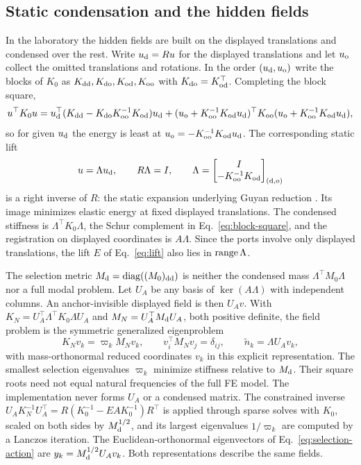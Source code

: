\subsection{Static condensation and the hidden fields}\label{sec:field-details}
In the laboratory the hidden fields are built on the displayed translations
and condensed over the rest. Write $u_{\rm d}=Ru$ for the displayed
translations and let $u_{\rm o}$ collect the omitted translations and
rotations. In the order $(u_{\rm d},u_{\rm o})$ write the blocks of $K_0$ as
$K_{\rm dd},K_{\rm do},K_{\rm od},K_{\rm oo}$ with $K_{\rm do}=K_{\rm od}^{\top}$.
Completing the block square,
\begin{equation}
 u^{\top}K_0u=u_{\rm d}^{\top}
 (K_{\rm dd}-K_{\rm do}K_{\rm oo}^{-1}K_{\rm od})u_{\rm d}
 +(u_{\rm o}+K_{\rm oo}^{-1}K_{\rm od}u_{\rm d})^{\top}K_{\rm oo}
 (u_{\rm o}+K_{\rm oo}^{-1}K_{\rm od}u_{\rm d}),
 \label{eq:block-square}
\end{equation}
so for given $u_{\rm d}$ the energy is least at
$u_{\rm o}=-K_{\rm oo}^{-1}K_{\rm od}u_{\rm d}$. The corresponding static lift
\begin{equation}
 u=\Lambda u_{\rm d},\qquad R\Lambda=I,\qquad
 \Lambda=\begin{bmatrix}I\\-K_{\rm oo}^{-1}K_{\rm od}\end{bmatrix}_{(\rm d,o)}
 \label{eq:static-lift}
\end{equation}
is a right inverse of $R$: the static expansion underlying Guyan reduction
\citep{guyan1965}. Its image minimizes elastic energy at fixed displayed
translations.
The condensed stiffness is $\Lambda^{\top}K_0\Lambda$, the Schur complement in
Eq.~\eqref{eq:block-square}, and the registration on displayed coordinates is
$A\Lambda$. Since the ports involve only displayed translations, the lift $E$
of Eq.~\eqref{eq:lift} also lies in $\operatorname{range}\Lambda$.

The selection metric $M_{\rm d}=\operatorname{diag}((M_0)_{\rm dd})$ is neither the
condensed mass $\Lambda^{\top}M_0\Lambda$ nor a full modal problem. Let
$U_A$ be any basis of $\ker(A\Lambda)$ with independent columns. An
anchor-invisible displayed field is then $U_Av$. With
$K_N=U_A^{\top}\Lambda^{\top}K_0\Lambda U_A$ and $M_N=U_A^{\top}M_{\rm d}U_A$,
both positive definite, the field problem is the symmetric generalized
eigenproblem
\begin{equation}
 K_Nv_k=\varpi_kM_Nv_k,\qquad v_i^{\top}M_Nv_j=\delta_{ij},\qquad
 \widetilde n_k=\Lambda U_Av_k,
 \label{eq:fe-fields}
\end{equation}
with mass-orthonormal reduced coordinates $v_k$ in this explicit
representation. The smallest selection
eigenvalues $\varpi_k$ minimize stiffness relative to $M_{\rm d}$. Their
square roots need not equal natural frequencies of the full FE model. The
implementation never forms $U_A$ or a condensed matrix. The constrained
inverse $U_AK_N^{-1}U_A^{\top}=R(K_0^{-1}-EAK_0^{-1})R^{\top}$ is applied
through sparse solves with $K_0$, scaled on both sides by $M_{\rm d}^{1/2}$,
and its largest eigenvalues $1/\varpi_k$ are computed by a Lanczos iteration.
The Euclidean-orthonormal eigenvectors of Eq.~\eqref{eq:selection-action}
are $y_k=M_{\rm d}^{1/2}U_Av_k$. Both representations describe the same fields.

